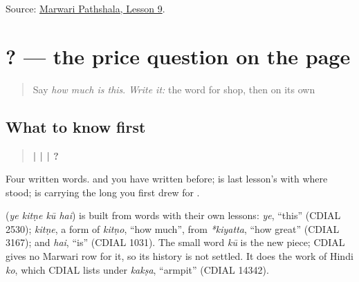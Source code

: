 \begin{tcolorbox}[breakable,colback=teal!4,colframe=teal!35!black,title={Before you move on}]
Source: \href{https://www.marwaripathshala.com/marwari-lesson-9-english}{Marwari Pathshala, Lesson 9}.
\end{tcolorbox}
\section[\texorpdfstring{\mw{ये} \mw{कितणे} \mw{कू} \mw{है}? (ye kitṇe kū hai?)}{ये कितणे कू है? (ye kitṇe kū hai?)}]{   ? — the price question on the page}

\label{lesson:MW-C22-price-question}



\begin{quote}
Say \emph{how much is this}. \emph{Write it:} the word for shop, then \textbf{} on its own
\end{quote}

\subsection*{What to know first}
\begin{quote}
\textbf{ |  |  | ?}
\end{quote}

Four written words. \textbf{} and \textbf{} you have written before; \textbf{} is last lesson's \textbf{} with \textbf{} where \textbf{} stood; \textbf{} is \textbf{} carrying the long \textbf{} you first drew for \textbf{}.

\begin{cousinweb}
\textbf{   } (\emph{ye kitṇe kū hai}) is built from words with their own lessons: \emph{ye}, \textquotedblleft{}this\textquotedblright{} (CDIAL 2530); \emph{kitṇe}, a form of \emph{kitṇo}, \textquotedblleft{}how much\textquotedblright{}, from \emph{*kiyatta}, \textquotedblleft{}how great\textquotedblright{} (CDIAL 3167); and \emph{hai}, \textquotedblleft{}is\textquotedblright{} (CDIAL 1031). The small word \emph{kū} is the new piece; CDIAL gives no Marwari row for it, so its history is not settled. It does the work of Hindi \emph{ko}, which CDIAL lists under \emph{kakṣa}, \textquotedblleft{}armpit\textquotedblright{} (CDIAL 14342).
\end{cousinweb}

